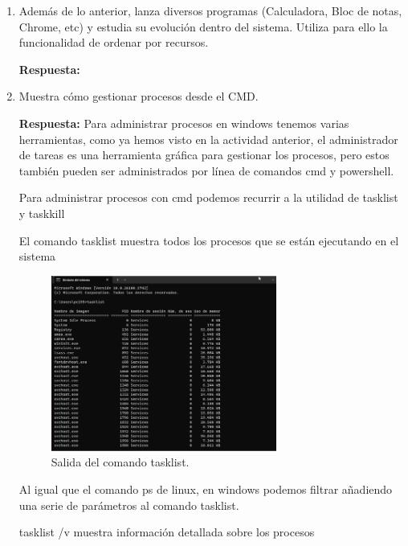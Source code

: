 \documentclass[a4paper,12pt]{article}
\begin{document}
\begin{enumerate}[label=\textbf{Pregunta \arabic*.}]
\begin{itemize}
    
    \end{itemize}

    \item Además de lo anterior, lanza diversos programas (Calculadora, Bloc de notas, Chrome, etc) y estudia su evolución dentro del sistema. Utiliza para ello la funcionalidad de ordenar por recursos.

    \textbf{Respuesta:}
    \item Muestra cómo gestionar procesos desde el CMD.

    \textbf{Respuesta:}
    Para administrar procesos en windows tenemos varias herramientas, como ya hemos visto en la actividad anterior, el administrador de tareas es una herramienta gráfica para gestionar los procesos, pero estos también pueden ser administrados por línea de comandos cmd y powershell.

    Para administrar procesos con cmd podemos recurrir a la utilidad de tasklist y taskkill

    El comando tasklist muestra todos los procesos que se están ejecutando en el sistema

    \begin{figure}[h!]
        \centering
        \includegraphics[width=0.7\textwidth]{7.png}
        \caption{Salida del comando tasklist.}
    \end{figure}

    Al igual que el comando ps de linux, en windows podemos filtrar añadiendo una serie de parámetros al comando tasklist. 

    tasklist /v muestra información detallada sobre los procesos


\end{enumerate}
\end{document}
